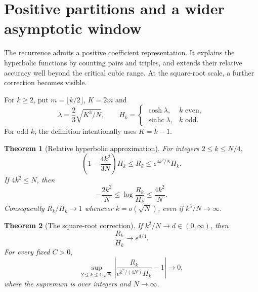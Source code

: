 \documentclass[11pt]{article}
\newtheorem{theorem}{Theorem}[section]
\theoremstyle{definition}
\theoremstyle{remark}
\newcommand{\1}{\mathbf 1}
\newcommand{\shc}{\operatorname{sinhc}}
\begin{document}
\section{Positive partitions and a wider asymptotic window}\label{sec:extension}

The recurrence admits a positive coefficient representation. It explains the hyperbolic functions by counting pairs and triples, and extends their relative accuracy well beyond the critical cubic range. At the square-root scale, a further correction becomes visible.

For $k\ge2$, put $m=\lfloor k/2\rfloor$, $K=2m$ and
\begin{equation}\label{eq:hyperdef}
\lambda=\frac23\sqrt{K^3/N},\qquad
H_k=\begin{cases}\cosh\lambda,&k\text{ even},\\
\shc\lambda,&k\text{ odd}.
\end{cases}
\end{equation}
For odd $k$, the definition intentionally uses $K=k-1$.



\begin{theorem}[Relative hyperbolic approximation]\label{thm:window}
For integers $2\le k\le N/4$,
\begin{equation}\label{eq:envelope}
\left(1-\frac{4k^2}{3N}\right)H_k
\le R_k\le e^{4k^2/N}H_k.
\end{equation}
If $4k^2\le N$, then
\begin{equation}\label{eq:logerror}
-\frac{2k^2}N\le\log\frac{R_k}{H_k}\le\frac{4k^2}N.
\end{equation}
Consequently $R_k/H_k\to1$ whenever $k=o(\sqrt N)$, even if $k^3/N\to\infty$.
\end{theorem}

\begin{theorem}[The square-root correction]\label{thm:sqrt}
If $k^2/N\to d\in(0,\infty)$, then
\begin{equation}\label{eq:sqrtlimit}
\frac{R_k}{H_k}\longrightarrow e^{d/4}.
\end{equation}
For every fixed $C>0$,
\begin{equation}\label{eq:uniformsqrt}
\sup_{2\le k\le C\sqrt N}
\left|\frac{R_k}{e^{k^2/(4N)}H_k}-1\right|\longrightarrow0,
\end{equation}
where the supremum is over integers and $N\to\infty$.
\end{theorem}
\end{document}
